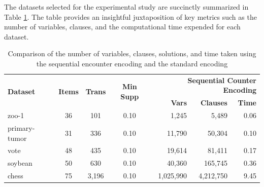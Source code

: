 The datasets selected for the experimental study are succinctly summarized
in Table \ref{tab:result_benchmark_real_datasets}.
The table provides an insightful juxtaposition of key metrics such as the number of variables,
clauses, and the computational time expended for each dataset.

\begin{table}[H]
    \centering
    \caption{Comparison of the number of variables, clauses, solutions, and time taken using the sequential encounter encoding and the standard encoding}
    \label{tab:result_benchmark_real_datasets}
    \begin{tabular}{|l|c|c|c|r|r|r|}
        \hline
        \multirow{2}{*}{\textbf{Dataset}} & \multirow{2}{*}{\textbf{Items}} & \multirow{2}{*}{\textbf{Trans}} & \multirow{2}{*}{\textbf{Min Supp}} & \multicolumn{3}{r|}{\textbf{Sequential Counter Encoding}}                                    \\ \cline{5-7}
                                          &                                 &                                 &                                    & \textbf{Vars}                                             & \textbf{Clauses} & \textbf{Time} \\ \hline
        zoo-1                             & 36                              & 101                             & 0.10                               & 1,245                                                     & 5,489            & 0.06          \\
        primary-tumor                     & 31                              & 336                             & 0.10                               & 11,790                                                    & 50,304           & 0.10          \\
        vote                              & 48                              & 435                             & 0.10                               & 19,614                                                    & 81,411           & 0.17          \\
        soybean                           & 50                              & 630                             & 0.10                               & 40,360                                                    & 165,745          & 0.36          \\
        chess                             & 75                              & 3,196                           & 0.10                               & 1,025,990                                                 & 4,212,750        & 9.45          \\

\end{tabular}
\end{table}
